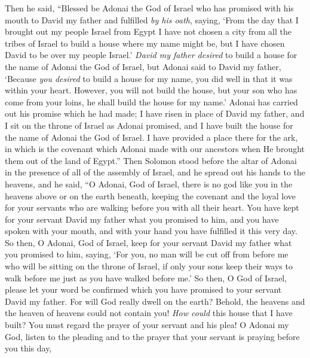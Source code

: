 \begin{biblechapter}
\verse Then he said, “Blessed be Adonai the God of Israel who has promised with his mouth to David my father and fulfilled \textit{by his oath}, saying,
\verse ‘From the day that I brought out my people Israel from Egypt I have not chosen a city from all the tribes of Israel to build a house where my name might be, but I have chosen David to be over my people Israel.’
\verse \textit{David my father desired} to build a house for the name of Adonai the God of Israel,
\verse but Adonai said to David my father, ‘Because \textit{you desired} to build a house for my name, you did well in that it was within your heart.
\verse However, you will not build the house, but your son who has come from your loins, he shall build the house for my name.’
\verse Adonai has carried out his promise which he had made; I have risen in place of David my father, and I sit on the throne of Israel as Adonai promised, and I have built the house for the name of Adonai the God of Israel.
\verse I have provided a place there for the ark, in which is the covenant which Adonai made with our ancestors when He brought them out of the land of Egypt.”
 Then Solomon stood before the altar of Adonai in the presence of all of the assembly of Israel, and he spread out his hands to the heavens,
\verse and he said, “O Adonai, God of Israel, there is no god like you in the heavens above or on the earth beneath, keeping the covenant and the loyal love for your servants who are walking before you with all their heart.
\verse You have kept for your servant David my father what you promised to him, and you have spoken with your mouth, and with your hand you have fulfilled it this very day.
\verse So then, O Adonai, God of Israel, keep for your servant David my father what you promised to him, saying, ‘For you, no man will be cut off from before me who will be sitting on the throne of Israel, if only your sons keep their ways to walk before me just as you have walked before me.’
\verse So then, O God of Israel, please let your word be confirmed which you have promised to your servant David my father.
\verse For will God really dwell on the earth? Behold, the heavens and the heaven of heavens could not contain you! \textit{How could} this house that I have built?
\verse You must regard the prayer of your servant and his plea! O Adonai my God, listen to the pleading and to the prayer that your servant is praying before you this day,

\end{biblechapter}

